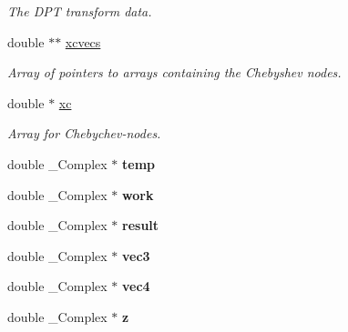 \begin{DoxyCompactItemize}
\begin{DoxyCompactList}\small\item\em The D\-P\-T transform data. \end{DoxyCompactList}\item 
\hypertarget{structfpt__set__s___a58a8f2867286e0be19dd89e8d41c033b}{double $\ast$$\ast$ \hyperlink{structfpt__set__s___a58a8f2867286e0be19dd89e8d41c033b}{xcvecs}}\label{structfpt__set__s___a58a8f2867286e0be19dd89e8d41c033b}

\begin{DoxyCompactList}\small\item\em Array of pointers to arrays containing the Chebyshev nodes. \end{DoxyCompactList}\item 
double $\ast$ \hyperlink{structfpt__set__s___a226e29e0f97627e77ec4fcebd0c49fdf}{xc}
\begin{DoxyCompactList}\small\item\em Array for Chebychev-\/nodes. \end{DoxyCompactList}\item 
\hypertarget{structfpt__set__s___ad93080b29d1b51fe3fdda734b308a4f4}{double \-\_\-\-Complex $\ast$ {\bfseries temp}}\label{structfpt__set__s___ad93080b29d1b51fe3fdda734b308a4f4}

\item 
\hypertarget{structfpt__set__s___a16cf21fa35d0a74d8f86e6b8c85352bb}{double \-\_\-\-Complex $\ast$ {\bfseries work}}\label{structfpt__set__s___a16cf21fa35d0a74d8f86e6b8c85352bb}

\item 
\hypertarget{structfpt__set__s___a5a55e5634be8d74b828bfb5fbcbc6514}{double \-\_\-\-Complex $\ast$ {\bfseries result}}\label{structfpt__set__s___a5a55e5634be8d74b828bfb5fbcbc6514}

\item 
\hypertarget{structfpt__set__s___abfc15a0e80ecd9063ef920582eb88a7c}{double \-\_\-\-Complex $\ast$ {\bfseries vec3}}\label{structfpt__set__s___abfc15a0e80ecd9063ef920582eb88a7c}

\item 
\hypertarget{structfpt__set__s___a4bf278d535fe4efee8b066bedf845d48}{double \-\_\-\-Complex $\ast$ {\bfseries vec4}}\label{structfpt__set__s___a4bf278d535fe4efee8b066bedf845d48}

\item 
\hypertarget{structfpt__set__s___ae16f7eb81c5cc6e4519b81207096454f}{double \-\_\-\-Complex $\ast$ {\bfseries z}}\label{structfpt__set__s___ae16f7eb81c5cc6e4519b81207096454f}


\end{DoxyCompactItemize}
